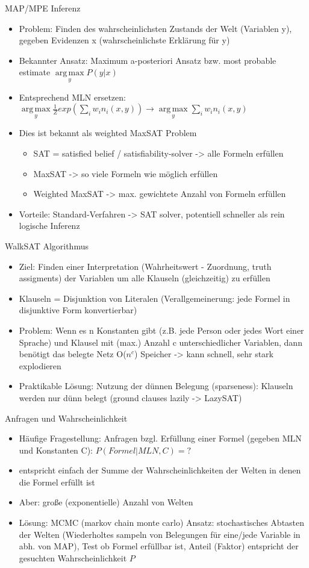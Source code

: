 \documentclass[paper=a4, fontsize=11pt]{scrartcl} %
\numberwithin{equation}{section} %
\numberwithin{figure}{section} %
\numberwithin{table}{section} %
\DeclareMathOperator*{\argmax}{arg\,max}
\begin{document}
MAP/MPE Inferenz
\begin{itemize}
\item Problem: Finden des wahrscheinlichsten Zustands der Welt (Variablen y), gegeben Evidenzen x (wahrscheinlichste Erklärung für y)
\item Bekannter Ansatz: Maximum a-posteriori Ansatz bzw. most probable estimate $\argmax\limits_y P(y{|x})$
\item Entsprechend MLN ersetzen: $\argmax\limits_y \frac{1}{Z} exp(\sum\limits_i w_i n_i(x,y)) \rightarrow \argmax\limits_y \sum\limits_i w_i n_i(x,y)$
\item Dies ist bekannt als weighted MaxSAT Problem
\begin{itemize}
\item SAT = satisfied belief / satisfiability-solver -> alle Formeln erfüllen
\item MaxSAT -> so viele Formeln wie möglich erfüllen
\item Weighted MaxSAT -> max. gewichtete Anzahl von Formeln erfüllen
\end{itemize}
\item Vorteile: Standard-Verfahren -> SAT solver, potentiell schneller als rein logische Inferenz
\end{itemize}

WalkSAT Algorithmus
\begin{itemize}
\item Ziel: Finden einer Interpretation (Wahrheitswert - Zuordnung, truth assigments) der Variablen um alle Klauseln (gleichzeitig) zu erfüllen
\item Klauseln = Disjunktion von Literalen (Verallgemeinerung: jede Formel in disjunktive Form konvertierbar)
\item Problem: Wenn es n Konstanten gibt (z.B. jede Person oder jedes Wort einer Sprache) und Klausel mit (max.) Anzahl c unterschiedlicher Variablen, dann benötigt das belegte Netz O($n^c$) Speicher -> kann schnell, sehr stark explodieren
\item Praktikable Lösung: Nutzung der dünnen Belegung (sparseness): Klauseln werden nur dünn belegt (ground clauses lazily -> LazySAT)
\end{itemize}

Anfragen und Wahrscheinlichkeit
\begin{itemize}
\item Häufige Fragestellung: Anfragen bzgl. Erfüllung einer Formel (gegeben MLN und Konstanten C): $P(Formel|MLN,C) = ?$
\item entspricht einfach der Summe der Wahrscheinlichkeiten der Welten in denen die Formel erfüllt ist
\item Aber: große (exponentielle) Anzahl von Welten
\item Lösung: MCMC (markov chain monte carlo) Ansatz: stochastisches Abtasten der Welten (Wiederholtes sampeln von Belegungen für eine/jede Variable in abh. von MAP), Test ob Formel erfüllbar ist, Anteil (Faktor) entspricht der gesuchten Wahrscheinlichkeit $P$
\end{itemize}
\end{document}
